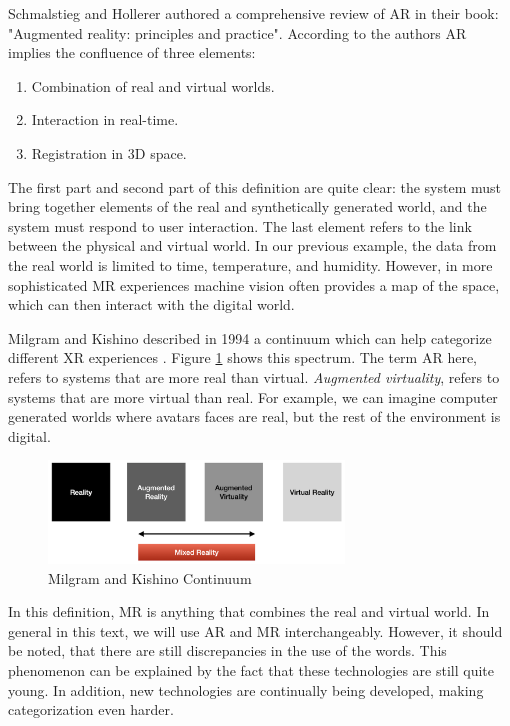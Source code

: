 Schmalstieg and Hollerer\cite{schmalstieg2016augmented} authored a comprehensive review of AR in their book: "Augmented reality: principles and practice". According to the authors AR implies the confluence of three elements:

\begin{enumerate}
    \item Combination of real and virtual worlds. 
    \item Interaction in real-time.
    \item Registration in 3D space. 
\end{enumerate}

The first part and second part of this definition are quite clear: the system must bring together elements of the real and synthetically generated world, and the system must respond to user interaction. The last element refers to the link between the physical and virtual world. In our previous example, the data from the real world is limited to time, temperature, and humidity. However, in more sophisticated MR experiences machine vision often provides a map of the space, which can then interact with the digital world. 

Milgram and Kishino described in 1994 a continuum which can help categorize different XR experiences \cite{schmalstieg2016augmented}. Figure \ref{fig:continuum} shows this spectrum. The term AR here, refers to systems that are more real than virtual. \textit{Augmented virtuality}, refers to systems that are more virtual than real. For example, we can imagine computer generated worlds where avatars faces are real, but the rest of the environment is digital.

\begin{figure}[ht!]%
\centering
\includegraphics[width=0.7\textwidth]{img/continuum.png} 
\caption{Milgram and Kishino Continuum}
\label{fig:continuum}
\end{figure}

In this definition, MR is anything that combines the real and virtual world. In general in this text, we will use AR and MR interchangeably. However, it should be noted, that there are still discrepancies in the use of the words. This phenomenon can be explained by the fact that these technologies are still quite young. In addition, new technologies are continually being developed, making categorization even harder.

